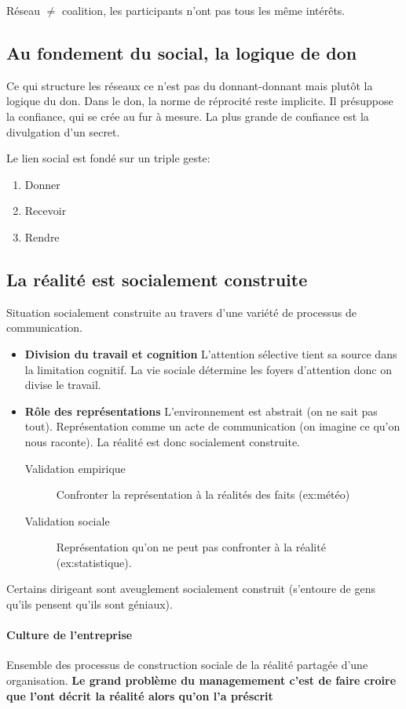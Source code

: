 \documentclass[11pt]{article} %
\begin{document}
Réseau $\neq$ coalition, les participants n'ont pas tous les même intérêts.

\subsection{Au fondement du social, la logique de don}
		Ce qui structure les réseaux ce n'est pas du donnant-donnant mais plutôt la logique du don. Dans le don, la norme de réprocité reste implicite. Il présuppose la confiance, qui se crée au fur à mesure. La plus grande de confiance est la divulgation d'un secret.

Le lien social est fondé sur un triple geste:
\begin{enumerate}
\item Donner
\item Recevoir
\item Rendre
\end{enumerate}

\subsection{La réalité est socialement construite}
		Situation socialement construite au travers d'une variété de processus de communication. 
		\begin{itemize}
			\item \textbf{Division du travail et cognition} L'attention sélective tient sa source dans la limitation cognitif. La vie sociale détermine les foyers d'attention donc on divise le travail.
			\item \textbf{Rôle des représentations} L'environnement est abstrait (on ne sait pas tout). Représentation comme un acte de  communication (on imagine ce qu'on nous raconte). La réalité est donc socialement construite.
			\begin{description}
				\item[Validation empirique] Confronter la représentation à la réalités des faits (ex:météo)
				\item[Validation sociale] Représentation qu'on ne peut pas confronter à la réalité 		
				(ex:statistique).
			\end{description}
		\end{itemize}
		Certains dirigeant sont aveuglement socialement construit (s'entoure de gens qu'ils pensent qu'ils sont 	
		géniaux).
		\paragraph{Culture de l'entreprise} Ensemble des processus de construction sociale de la réalité 
		partagée d'une organisation.
		\textbf{Le grand problème du managemement  c'est de faire croire que l'ont décrit la réalité alors 
		qu'on l'a préscrit}
\end{document}
